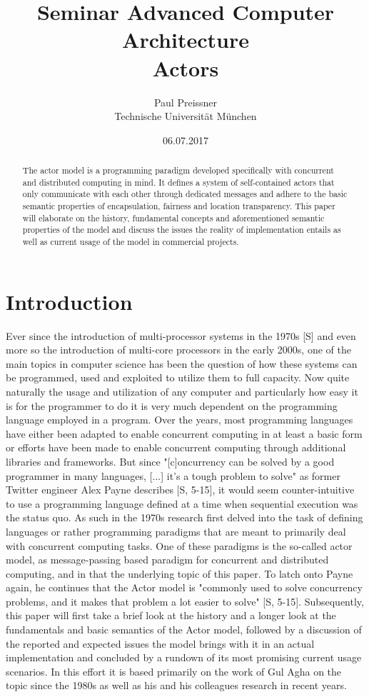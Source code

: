 \documentclass[A4]{article}
\author{Paul Preissner \\ Technische Universit\"at M\"unchen}
\title{Seminar Advanced Computer Architecture \\
       {\bf Actors}
}
\date{06.07.2017}
\begin{document}
\maketitle

\begin{abstract}
The actor model is a programming paradigm developed specifically with concurrent and distributed computing in mind. It defines a system of self-contained actors that only communicate with each other through dedicated messages and adhere to the basic semantic properties of encapsulation, fairness and location transparency. 
This paper will elaborate on the history, fundamental concepts and aforementioned semantic properties of the model and discuss the issues the reality of implementation entails as well as current usage of the model in commercial projects. 
\end{abstract}

\section{Introduction}
\label{introduction}
Ever since the introduction of multi-processor systems in the 1970s [S] and even more so the introduction of multi-core processors in the early 2000s, one of the main topics in computer science has been the question of how these systems can be programmed, used and exploited to utilize them to full capacity. Now quite naturally the usage and utilization of any computer and particularly how easy it is for the programmer to do it is very much dependent on the programming language employed in a program. 
Over the years, most programming languages have either been adapted to enable concurrent computing in at least a basic form or efforts have been made to enable concurrent computing through additional libraries and frameworks. But since "[c]oncurrency can be solved by a good programmer in many languages, [...] it's a tough problem to solve" as former Twitter engineer Alex Payne describes [S, 5-15], it would seem counter-intuitive to use a programming language defined at a time when sequential execution was the status quo. As such in the 1970s research first delved into the task of defining languages or rather programming paradigms that are meant to primarily deal with concurrent computing tasks. One of these paradigms is the so-called actor model, as message-passing based paradigm for concurrent and distributed computing, and in that the underlying topic of this paper. To latch onto Payne again, he continues that the Actor model is "commonly used to solve concurrency problems, and it makes that problem a lot easier to solve" [S, 5-15].
Subsequently, this paper will first take a brief look at the history and a longer look at the fundamentals and basic semantics of the Actor model, followed by a discussion of the reported and expected issues the model brings with it in an actual implementation and concluded by a rundown of its most promising current usage scenarios. In this effort it is based primarily on the work of Gul Agha on the topic since the 1980s as well as his and his colleagues research in recent years. 
\end{document}
